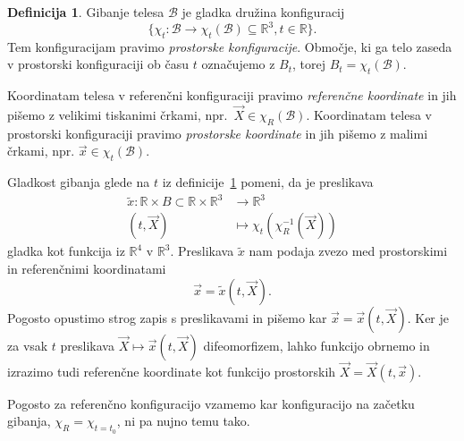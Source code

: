 \documentclass[12pt,a4paper]{article}
\theoremstyle{definition} %
\newtheorem{definicija}{Definicija}[section]
\theoremstyle{plain} %
\numberwithin{equation}{section}
\newcommand{\R}{\mathbb R}
\newcommand{\B}{\mathcal{B}}
\newcommand{\vX}{\vec{X}}
\newcommand{\vx}{\vec{x}}
\begin{document}
\begin{definicija}
  \label{def:gibanje}
  Gibanje telesa $\B$ je gladka družina konfiguracij
  \[
    \{\chi_t\colon \B \to\chi_t(\B) \subseteq \R^3, t \in \R\}.
  \]
  Tem konfiguracijam pravimo \emph{prostorske konfiguracije}. Območje, ki ga
  telo zaseda v prostorski konfiguraciji ob času $t$ označujemo z $B_t$, torej
  $B_t = \chi_t(\B)$.
\end{definicija}
Koordinatam telesa v referenčni konfiguraciji pravimo \emph{referenčne
koordinate} in jih pišemo z velikimi tiskanimi črkami, npr.\ $\vX \in \chi_R(\B)$.
Koordinatam telesa v prostorski konfiguraciji pravimo \emph{prostorske
koordinate} in jih pišemo z malimi črkami, npr. $\vx \in \chi_t(\B)$.

Gladkost gibanja glede na $t$ iz definicije~\ref{def:gibanje} pomeni, da je
preslikava
\begin{align*}
  \tilde{x}\colon \R \times B \subset \R \times \R^3&\to \R^3 \\
  (t, \vX) &\mapsto \chi_t(\chi_R^{-1}(\vX))
\end{align*}
gladka kot funkcija iz $\R^4$ v $\R^3$.
Preslikava $\tilde x$ nam podaja zvezo med prostorskimi in referenčnimi
koordinatami
\[
  \vx = \tilde x(t, \vX).
\]
Pogosto opustimo strog zapis s preslikavami in pišemo kar $\vx = \vx(t, \vX)$.
Ker je za vsak $t$ preslikava $\vX \mapsto \vx(t, \vX)$ difeomorfizem, lahko funkcijo
obrnemo in izrazimo tudi referenčne koordinate kot funkcijo prostorskih $\vX = \vX(t, \vx)$.

Pogosto za referenčno konfiguracijo vzamemo kar konfiguracijo na začetku
gibanja, $\chi_R = \chi_{t=t_0}$, ni pa nujno temu tako.
\end{document}

